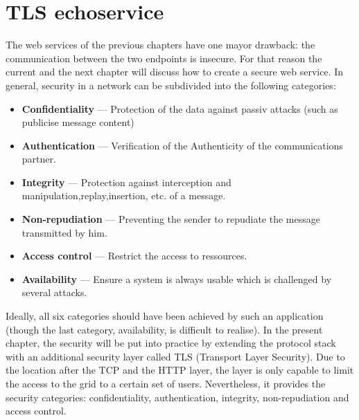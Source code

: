 \chapter{TLS echoservice}

The web services of the previous chapters have one mayor drawback: the communication between the two endpoints is insecure.
For that reason the current and the next chapter will discuss how to create a secure web service.
In general, security in a network can be subdivided into the following categories:~\cite{TANNENBAUM_2001}
\begin{itemize}
	\item \textbf{Confidentiality} --- Protection of the data against passiv attacks (such as publicise message content)
	
	\item \textbf{Authentication} --- Verification of the Authenticity  of the communications partner.

	\item \textbf{Integrity} --- Protection against interception and manipulation,replay,insertion, etc.  of a message.

	\item \textbf{Non-repudiation} --- Preventing the sender to repudiate the message transmitted by him.

	\item \textbf{Access control} --- Restrict the access to ressources.

	\item \textbf{Availability} --- Ensure a system is always usable which is challenged by several attacks.

\end{itemize}
%
Ideally, all six categories should have been achieved by such an application (though the last category, availability, is difficult to realise).
In the present chapter, the security will be put into practice by extending the protocol stack with an additional security layer called TLS (Transport Layer Security).
Due to the location after the TCP and the HTTP layer, the layer is only capable to limit the access to the grid to a certain set of users.
Nevertheless, it provides the security categories: confidentiality, authentication, integrity, non-repudiation and access control.


